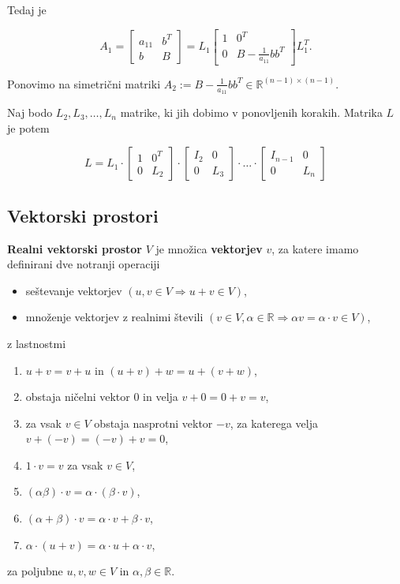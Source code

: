 \documentclass{article}
\begin{document}
\begin{multicols}{2}
Tedaj je

\[
A_1 = \begin{bmatrix}
a_{11} & b^T \\
b & B
\end{bmatrix} = L_1 \begin{bmatrix}
1 & 0^T \\
0 & B - \frac{1}{a_{11}} bb^T
\end{bmatrix} L_1^T.
\]

Ponovimo na simetrični matriki \( A_2 := B - \frac{1}{a_{11}} bb^T \in \mathbb{R}^{(n-1) \times (n-1)} \).

Naj bodo \( L_2, L_3, \ldots, L_n \) matrike, ki jih dobimo v ponovljenih korakih. Matrika \( L \) je potem

\[
L = L_1 \cdot \left[ \begin{array}{cc}
1 & 0^T \\
0 & L_2
\end{array} \right] \cdot \left[ \begin{array}{cc}
I_2 & 0 \\
0 & L_3
\end{array} \right] \cdot \ldots \cdot \left[ \begin{array}{cc}
I_{n-1} & 0 \\
0 & L_n
\end{array} \right]
\]

\subsection{Vektorski prostori}

\textbf{Realni vektorski prostor} \( V \) je množica \textbf{vektorjev} \( v \), za katere imamo definirani dve notranji operaciji
\begin{itemize}
    \item seštevanje vektorjev \( (u, v \in V \Rightarrow u+v \in V) \),
    \item množenje vektorjev z realnimi števili \( (v \in V, \alpha \in \mathbb{R} \Rightarrow \alpha v = \alpha \cdot v \in V) \),
\end{itemize}
z lastnostmi
\begin{enumerate}
    \item \( u + v = v + u \) in \( (u + v) + w = u + (v + w) \),
    \item obstaja ničelni vektor \( 0 \) in velja \( v + 0 = 0 + v = v \),
    \item za vsak \( v \in V \) obstaja nasprotni vektor \( -v \), za katerega velja \( v + (-v) = (-v) + v = 0 \),
    \item \( 1 \cdot v = v \) za vsak \( v \in V \),
    \item \( (\alpha\beta) \cdot v = \alpha \cdot (\beta \cdot v) \),
    \item \( (\alpha + \beta) \cdot v = \alpha \cdot v + \beta \cdot v \),
    \item \( \alpha \cdot (u + v) = \alpha \cdot u + \alpha \cdot v \),
\end{enumerate}
za poljubne \( u, v, w \in V \) in \( \alpha, \beta \in \mathbb{R} \).



\end{multicols}
\end{document}
